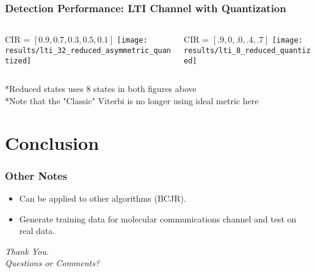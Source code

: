 \documentclass[10pt,tgadventor, onlymath]{beamer}
\begin{document}
\begin{frame}
\frametitle{Detection Performance: LTI Channel with Quantization}
\begin{columns}
\begin{column}{0.5\linewidth}
\centering
CIR = $[0.9, 0.7, 0.3, 0.5, 0.1]$
	\texttt{[image: results/lti\_32\_reduced\_asymmetric\_quantized]}
\end{column}
\begin{column}{0.5\linewidth}
\centering
CIR = $[.9, 0, .0, .4, .7]$
	\texttt{[image: results/lti\_8\_reduced\_quantized]}
\end{column}
\end{columns}

*Reduced states uses 8 states in both figures above
\\
*Note that the "Classic" Viterbi is no longer using ideal metric here
\end{frame}

\section{Conclusion}

\begin{frame}
\frametitle{Other Notes}
\begin{itemize}
\item Can be applied to other algorithms (BCJR).
\item Generate training data for molecular communications channel and test on real data.
\end{itemize}
\end{frame}

\begin{frame}
  \centering \Large
  \emph{Thank You.}
  \\
	\bigskip
    \centering \Large
  \emph{Questions or Comments?}
\end{frame}
\end{document}
